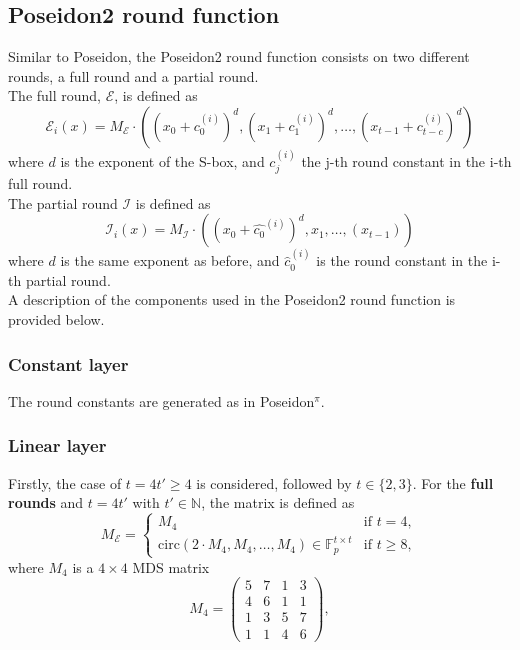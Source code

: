 \subsection*{Poseidon2 round function}
Similar to Poseidon, the Poseidon2 round function consists on two different rounds, a full round and a partial round.\\
The full round, $\mathcal{E}$, is defined as
\begin{equation}
    \mathcal{E}_i(x) = M_{\mathcal{E}}\cdot\left(\left(x_0+c_0^{(i)}\right)^d,\left(x_1+c_1^{(i)}\right)^d,\dots,\left(x_{t-1}+c_{t-c}^{(i)}\right)^d\right)
\end{equation}
where $d$ is the exponent of the S-box, and $c_j^{(i)}$ the j-th round constant in the i-th full round.\\
The partial round $\mathcal{I}$ is defined as
\begin{equation}
    \mathcal{I}_i(x) = M_{\mathcal{I}}\cdot\left(\left(x_0+\hat{c_0}^{(i)}\right)^d,x_1,\dots,\left(x_{t-1}\right)\right)
\end{equation}
where $d$ is the same exponent as before, and $\hat{c}_0^{(i)}$ is the round constant in the i-th partial round.\\
A description of the components used in the Poseidon2 round function is provided below.

\subsubsection*{Constant layer}
The round constants are generated as in Poseidon$^\pi$.

\subsubsection*{Linear layer}
Firstly, the case of $t = 4t' \geq 4$ is considered, followed by $t\in\{2,3\}$.
For the \textbf{full rounds} and $t = 4t'$ with $t' \in \mathbb{N}$, the matrix is defined as
\begin{equation}
    M_\mathcal{E} =
    \begin{cases}
        M_4 & \text{if } t=4, \\
        \text{circ}\left(2\cdot M_4,M_4,\dots,M_4\right)\in \mathbb{F}_p^{t\times t} & \text{if } t\geq 8,
    \end{cases}
\end{equation}
where $M_4$ is a $4\times 4$ MDS matrix
\begin{equation}
    M_4 = 
    \begin{pmatrix}
        5 & 7 & 1 & 3 \\
        4 & 6 & 1 & 1 \\
        1 & 3 & 5 & 7 \\
        1 & 1 & 4 & 6
    \end{pmatrix}
    ,
\end{equation}

